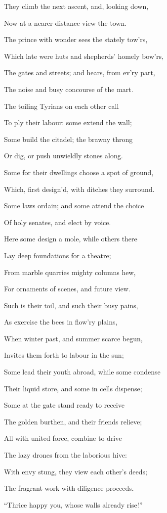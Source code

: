 They climb the next ascent, and, looking down,

Now at a nearer distance view the town.

The prince with wonder sees the stately tow’rs,

Which late were huts and shepherds’ homely bow’rs,

The gates and streets; and hears, from ev’ry part,

The noise and busy concourse of the mart.

The toiling Tyrians on each other call

To ply their labour: some extend the wall;

Some build the citadel; the brawny throng

Or dig, or push unwieldly stones along.

Some for their dwellings choose a spot of ground,

Which, first design’d, with ditches they surround.

Some laws ordain; and some attend the choice

Of holy senates, and elect by voice.

Here some design a mole, while others there

Lay deep foundations for a theatre;

From marble quarries mighty columns hew,

For ornaments of scenes, and future view.

Such is their toil, and such their busy pains,

As exercise the bees in flow’ry plains,

When winter past, and summer scarce begun,

Invites them forth to labour in the sun;

Some lead their youth abroad, while some condense

Their liquid store, and some in cells dispense;

Some at the gate stand ready to receive

The golden burthen, and their friends relieve;

All with united force, combine to drive

The lazy drones from the laborious hive:

With envy stung, they view each other’s deeds;

The fragrant work with diligence proceeds.

“Thrice happy you, whose walls already rise!”

